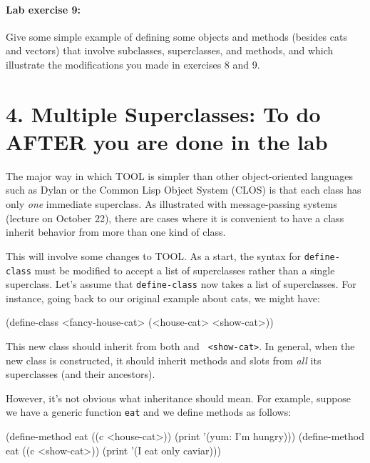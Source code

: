 \paragraph{Lab exercise 9:} Give some simple example of defining some
objects and methods (besides cats and vectors) that involve
subclasses, superclasses, and methods, and which illustrate the
modifications you made in exercises 8 and 9.

\section{4. Multiple Superclasses: To do AFTER you are done in the lab}


\smallskip

The major way in which TOOL is simpler than other object-oriented
languages such as Dylan or the Common Lisp Object System (CLOS) is
that each class has only {\it one} immediate superclass.  As
illustrated with message-passing systems (lecture on October 22),
there are cases where it is convenient to have a class inherit
behavior from more than one kind of class.

This will involve some changes to TOOL.  As a start, the syntax for
{\tt define-class} must be modified to accept a list of superclasses
rather than a single superclass.  Let's assume that {\tt define-class}
now takes a list of superclasses.  For instance, going back to our
original example about cats, we might have:

\beginlisp
(define-class <fancy-house-cat> (<house-cat> <show-cat>))
\endlisp

\noindent
This new class should inherit from both {\tt <house-cat>} and {\tt
<show-cat>}.  In general, when the new class is constructed, it should
inherit methods and slots from {\it all} its superclasses (and their
ancestors).

However, it's not obvious what inheritance should mean.  For example,
suppose we have a generic function {\tt eat} and we define methods as
follows:

\beginlisp
(define-method eat ((c <house-cat>))
   (print '(yum: I'm hungry)))
\null
(define-method eat ((c <show-cat>))
   (print '(I eat only caviar)))
\endlisp


